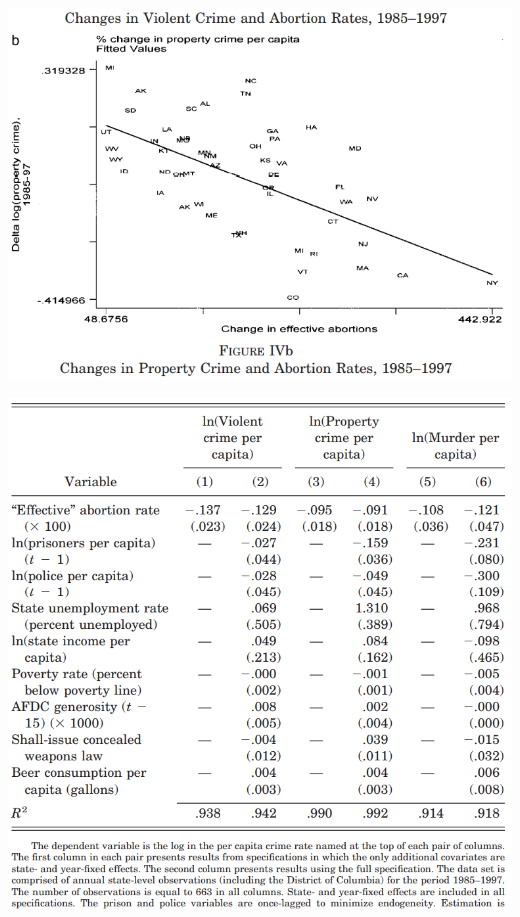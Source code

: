 \begin{frame}
    \vspace{-10pt}
    \begin{center}
    \includegraphics[width=\textwidth]{./resources/QJELevittScatter}
    \end{center}
\end{frame}

\begin{frame}
    \vspace{-10pt}
    \begin{center}
    \includegraphics[width=\textwidth]{./resources/QJELevittTable}
    \end{center}
\end{frame}

